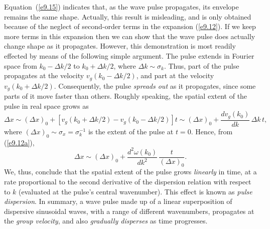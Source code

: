 Equation~(\ref{e9.15}) indicates that, as the wave pulse propagates, its envelope
remains the same shape. Actually, this result is misleading, and is only  obtained because
of the neglect of second-order terms in  the  expansion (\ref{e9.12}). If we keep more terms in this expansion then we can show that the wave pulse
does actually change shape as it propagates. However, this demonstration is most readily effected  by means of the
following simple argument. The pulse extends in Fourier space from $k_0-\Delta k/2$ to
$k_0+\Delta k/2$, where $\Delta k \sim \sigma_k$. Thus, part of the pulse
propagates at the velocity $v_g(k_0-\Delta k/2)$, and part at the
velocity $v_g(k_0+\Delta k/2)$. Consequently,  the pulse {\em spreads out}\/ as it propagates, since some parts of it move faster than others. 
Roughly speaking, the spatial extent of the pulse in real space grows as
\begin{equation}
\Delta x\sim (\Delta x)_0+ \left[v_g(k_0+\Delta k/2)-v_g(k_0-\Delta k/2)\right] t\sim
(\Delta x)_0+\frac{dv_g(k_0)}{dk}\,\Delta k\,t,
\end{equation}
where $(\Delta x)_0\sim \sigma_x=\sigma_k^{-1}$ is the extent of the pulse at $t=0$.
Hence, from (\ref{e9.12a}),
\begin{equation}
\Delta x \sim (\Delta x)_0 + \frac{d^2\omega(k_0)}{dk^2}\,\frac{t}{(\Delta x)_0}.
\end{equation}
We, thus, conclude that the spatial extent of the pulse grows {\em linearly}\/ in time, at a rate
proportional to the second derivative of the dispersion relation with respect to $k$ (evaluated at the pulse's central wavenumber). This effect is
known as  {\em pulse  dispersion}. In summary, a wave pulse made up of a linear superposition
of dispersive sinusoidal waves, with a range of  different wavenumbers, propagates at the {\em group velocity}, and also {\em gradually disperses}\/ as time progresses. 

